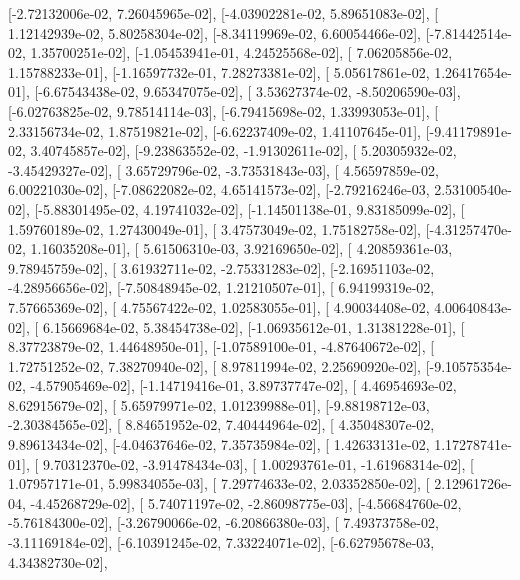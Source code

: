 \documentclass{article}
\begin{document}
       [-2.72132006e-02,  7.26045965e-02],
       [-4.03902281e-02,  5.89651083e-02],
       [ 1.12142939e-02,  5.80258304e-02],
       [-8.34119969e-02,  6.60054466e-02],
       [-7.81442514e-02,  1.35700251e-02],
       [-1.05453941e-01,  4.24525568e-02],
       [ 7.06205856e-02,  1.15788233e-01],
       [-1.16597732e-01,  7.28273381e-02],
       [ 5.05617861e-02,  1.26417654e-01],
       [-6.67543438e-02,  9.65347075e-02],
       [ 3.53627374e-02, -8.50206590e-03],
       [-6.02763825e-02,  9.78514114e-03],
       [-6.79415698e-02,  1.33993053e-01],
       [ 2.33156734e-02,  1.87519821e-02],
       [-6.62237409e-02,  1.41107645e-01],
       [-9.41179891e-02,  3.40745857e-02],
       [-9.23863552e-02, -1.91302611e-02],
       [ 5.20305932e-02, -3.45429327e-02],
       [ 3.65729796e-02, -3.73531843e-03],
       [ 4.56597859e-02,  6.00221030e-02],
       [-7.08622082e-02,  4.65141573e-02],
       [-2.79216246e-03,  2.53100540e-02],
       [-5.88301495e-02,  4.19741032e-02],
       [-1.14501138e-01,  9.83185099e-02],
       [ 1.59760189e-02,  1.27430049e-01],
       [ 3.47573049e-02,  1.75182758e-02],
       [-4.31257470e-02,  1.16035208e-01],
       [ 5.61506310e-03,  3.92169650e-02],
       [ 4.20859361e-03,  9.78945759e-02],
       [ 3.61932711e-02, -2.75331283e-02],
       [-2.16951103e-02, -4.28956656e-02],
       [-7.50848945e-02,  1.21210507e-01],
       [ 6.94199319e-02,  7.57665369e-02],
       [ 4.75567422e-02,  1.02583055e-01],
       [ 4.90034408e-02,  4.00640843e-02],
       [ 6.15669684e-02,  5.38454738e-02],
       [-1.06935612e-01,  1.31381228e-01],
       [ 8.37723879e-02,  1.44648950e-01],
       [-1.07589100e-01, -4.87640672e-02],
       [ 1.72751252e-02,  7.38270940e-02],
       [ 8.97811994e-02,  2.25690920e-02],
       [-9.10575354e-02, -4.57905469e-02],
       [-1.14719416e-01,  3.89737747e-02],
       [ 4.46954693e-02,  8.62915679e-02],
       [ 5.65979971e-02,  1.01239988e-01],
       [-9.88198712e-03, -2.30384565e-02],
       [ 8.84651952e-02,  7.40444964e-02],
       [ 4.35048307e-02,  9.89613434e-02],
       [-4.04637646e-02,  7.35735984e-02],
       [ 1.42633131e-02,  1.17278741e-01],
       [ 9.70312370e-02, -3.91478434e-03],
       [ 1.00293761e-01, -1.61968314e-02],
       [ 1.07957171e-01,  5.99834055e-03],
       [ 7.29774633e-02,  2.03352850e-02],
       [ 2.12961726e-04, -4.45268729e-02],
       [ 5.74071197e-02, -2.86098775e-03],
       [-4.56684760e-02, -5.76184300e-02],
       [-3.26790066e-02, -6.20866380e-03],
       [ 7.49373758e-02, -3.11169184e-02],
       [-6.10391245e-02,  7.33224071e-02],
       [-6.62795678e-03,  4.34382730e-02],
\end{document}
